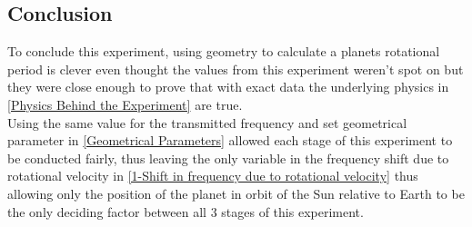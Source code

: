 \documentclass[11pt]{article}
\begin{document}
\begin{multicols}{2}
\section{Conclusion}

To conclude this experiment, using geometry to calculate a planets rotational period is clever even thought the values from this experiment weren't spot on but they were close enough to prove that with exact data the underlying physics in \cref{Physics Behind the Experiment} are true. \\

Using the same value for the transmitted frequency and set geometrical parameter in \cref{Geometrical Parameters} allowed each stage of this experiment to be conducted fairly, thus leaving the only variable in the frequency shift due to rotational velocity in \cref{1-Shift in frequency due to rotational velocity} thus allowing only the position of the planet in orbit of the Sun relative to Earth to be the only deciding factor between all 3 stages of this experiment.


\end{multicols}



\end{document}
